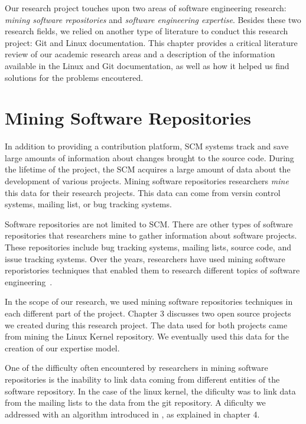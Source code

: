 \label{sec:RevLitt}


Our research project touches upon two areas of software engineering research: \textit{mining software repositories} and \textit{software engineering expertise}. Besides these two research fields, we relied on another type of literature to conduct this research project: Git and Linux documentation. This chapter provides a critical literature review of our academic research areas and a description of the information available in the Linux and Git documentation, as well as how it helped us find solutions for the problems encoutered.



\section{Mining Software Repositories}

In addition to providing a contribution platform, \ac{SCM} systems track and save large amounts of information about changes brought to the source code. During the lifetime of the project, the \ac{SCM} acquires a large amount of data about the development of various projects. Mining software repositories researchers \textit{mine} this data for their research projects. This data can come from versin control systems, mailing list, or bug tracking systems.

Software repositories are not limited to \ac{SCM}. There are other types of software repositories that researchers mine to gather information about software projects. These repositories include bug tracking systems, mailing lists, source code, and issue tracking systems. Over the years, researchers have used mining software reporistories techniques that enabled them to research different topics of software engineering~\citep{Bird-2009}.

In the scope of our research, we used mining software repositories techniques in each different part of the project. Chapter 3 discusses two open source projects we created during this research project. The data used for both projects came from mining the Linux Kernel repository. We eventually used this data for the creation of our expertise model.

One of the difficulty often encountered by researchers in mining software repositories is the inability to link data coming from different entities of the software repository. In the case of the linux kernel, the dificulty was to link data from the mailing lists to the data from the git repository. A dificulty we addressed with an algorithm introduced in \citep{msr13jojo}, as explained in chapter 4. 

